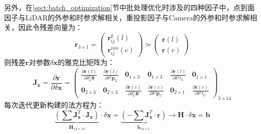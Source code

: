 另外，在\ref{sect:batch_optimization}节中批处理优化时涉及的四种因子中，点到面因子与LiDAR的外参和时参求解相关，重投影因子与Camera的外参和时参求解相关，因此令残差向量为：
\begin{equation}
  \boldsymbol{r}_{3\times 1}=\begin{pmatrix}
    \boldsymbol{r}_{ij}^k(l) \\\boldsymbol{r}_{ij}^{mn}(c)
  \end{pmatrix}
  \simeq
  \begin{pmatrix}
    \boldsymbol{r}(l) \\\boldsymbol{r}(c)
  \end{pmatrix}
\end{equation}
则残差$\boldsymbol{r}$对参数$\delta\boldsymbol{x}$的雅克比矩阵为：
\begin{equation}
  \boldsymbol{J}_{\boldsymbol{x}}=\frac{\partial \boldsymbol{r}}{\partial \delta \boldsymbol{x}}=
  \begin{pmatrix}
    \frac{\partial \boldsymbol{r}(l)}{\partial \delta {^{I}_{L}\boldsymbol{\theta}}} &
    \frac{\partial \boldsymbol{r}(l)}{\partial \delta {^{I}\boldsymbol{p}_L}}        &
    \boldsymbol{0}_{1\times 3}                                                       &
    \boldsymbol{0}_{1\times 3}                                                       &
    \frac{\partial \boldsymbol{r}(l)}{\partial \delta {^{I}t_{L}}}                   &
    \boldsymbol{0}_{1\times 1}                                                         \\
    \boldsymbol{0}_{2\times 3}                                                       &
    \boldsymbol{0}_{2\times 3}                                                       &
    \frac{\partial \boldsymbol{r}(c)}{\partial \delta {^{I}_{C}\boldsymbol{\theta}}} &
    \frac{\partial \boldsymbol{r}(c)}{\partial \delta {^{I}\boldsymbol{p}_C}}        &
    \boldsymbol{0}_{2\times 1}                                                       &
    \frac{\partial \boldsymbol{r}(c)}{\partial \delta {^{I}t_{C}}}
  \end{pmatrix}_{3\times 14}
\end{equation}
每次迭代更新构建的法方程为：
\begin{equation}
  \underbrace{\left(
    \sum\boldsymbol{J}_{\boldsymbol{x}}^T\cdot\boldsymbol{J}_{\boldsymbol{x}}
    \right)}_{\boldsymbol{H}_{14\times 14}}
  \cdot\delta\boldsymbol{x}=
  \underbrace{\left( -\sum \boldsymbol{J}_{\boldsymbol{x}}^T\cdot\boldsymbol{r}\right)}
  _{\boldsymbol{b}_{14\times 1}}\to\boldsymbol{H}
  \cdot\delta\boldsymbol{x}=\boldsymbol{b}
\end{equation}
